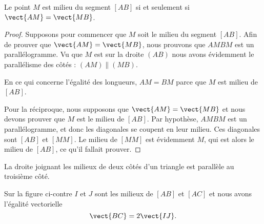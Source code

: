 \begin{propriete}\label{PropFHznUfJ}
    \begin{multicols}{2}

        Le point \( M\) est milieu du segment \( [AB]\) si et seulement si \( \vect{ AM }=\vect{ MB }\).

        \columnbreak



    \end{multicols}
\end{propriete}

\begin{proof}
    Supposons pour commencer que \( M\) soit le milieu du segment \( [AB]\). Afin de prouver que \( \vect{ AM }=\vect{ MB }\), nous prouvons que \( AMBM\) est un parallélogramme. Vu que \( M\) est sur la droite \( (AB)\) nous avons évidemment le parallélisme des côtés : \( (AM)\parallel (MB)\).

    En ce qui concerne l'égalité des longueurs, \( AM=BM\) parce que \( M\) est milieu de \( [AB]\).

    Pour la réciproque, nous supposons que \( \vect{ AM }=\vect{ MB }\) et nous devons prouver que \( M\) est le milieu de \( [AB]\).  Par hypothèse, \( AMBM\) est un parallélogramme, et donc les diagonales se coupent en leur milieu. Ces diagonales sont \( [AB]\) et \( [MM]\). Le milieu de \( [MM]\) est évidemment \( M\), qui est alors le milieu de \( [AB]\), ce qu'il fallait prouver.
\end{proof}

\begin{theorem}

    \begin{multicols}{2}
    La droite joignant les milieux de deux côtés d'un triangle est parallèle au troisième côté.

    Sur la figure ci-contre \( I\) et \( J\) sont les milieux de \( [AB]\) et \( [AC]\) et nous avons l'égalité vectorielle
    \begin{equation}
        \vect{ BC }=2\vect{ IJ }.
    \end{equation}

    \columnbreak

    \begin{center}

    \end{center}

    \end{multicols}
\end{theorem}

